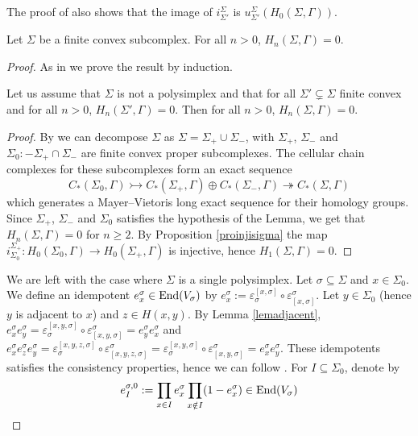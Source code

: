 \documentclass[a4paper,10pt]{amsart}
\begin{document}
\begin{Rem}
	The proof of \cite[Prop. 2.4.1 (b)]{Wanga} also shows that the image of $i_{\Sigma'}^{\Sigma}$ is $u_{\Sigma'}^{\Sigma}(H_0(\Sigma,\Gamma))$.
\end{Rem}

\begin{Lem}
	\label{lemHnzero}
	Let $\Sigma$ be a finite convex subcomplex. For all $n>0$, $H_n(\Sigma,\Gamma)=0$.
\end{Lem}

\begin{proof}
	As in \cite[Prop. 2.4.1 (a)]{Wanga} we prove the result by induction.

	\begin{Lem}
		Let us assume that $\Sigma$ is not a polysimplex and that for all $\Sigma' \subsetneq \Sigma$ finite convex and for all $n>0$, $H_n(\Sigma',\Gamma)=0$. Then for all $n>0$, $H_n(\Sigma,\Gamma)=0$.
	\end{Lem}

	\begin{proof}
		By \cite[Section 2.5]{meyer_resolutions_2010} we can decompose $\Sigma$ as $\Sigma=\Sigma_{+} \cup \Sigma_{-}$, with $\Sigma_{+}$, $\Sigma_{-}$ and $\Sigma_{0}:-\Sigma_{+}\cap \Sigma_{-}$ are finite convex proper subcomplexes. The cellular chain complexes for these subcomplexes form an exact sequence
		\[
			C_{*}(\Sigma_{0},\Gamma) \rightarrowtail C_{*}(\Sigma_{+},\Gamma) \oplus C_{*}(\Sigma_{-},\Gamma) \twoheadrightarrow C_{*}(\Sigma,\Gamma)
		\]
		which generates a Mayer–Vietoris long exact sequence for their homology groups. Since $\Sigma_{+}$, $\Sigma_{-}$ and $\Sigma_{0}$ satisfies the hypothesis of the Lemma, we get that $H_n(\Sigma,\Gamma)=0$ for $n\geq 2$. By Proposition \ref{proinjisigma} the map $i_{\Sigma_0}^{\Sigma_{+}} : H_0(\Sigma_0,\Gamma) \to H_0(\Sigma_{+},\Gamma)$ is injective, hence $H_1(\Sigma,\Gamma)=0$.
	\end{proof}

	We are left with the case where $\Sigma$ is a single polysimplex. Let $\sigma \subseteq \Sigma$ and $x\in \Sigma_0$. We define an idempotent $e_x^\sigma \in \operatorname{End}(V_\sigma)$ by  $e_x^\sigma:= \varepsilon_{\sigma}^{[x,\sigma]} \circ \varepsilon^{\sigma}_{[x,\sigma]}$. Let $y\in \Sigma_0$ (hence $y$ is adjacent to $x$) and $z\in H(x,y)$. By Lemma \ref{lemadjacent}, $e_x^\sigma e_y^\sigma = \varepsilon_{\sigma}^{[x,y,\sigma]} \circ \varepsilon^{\sigma}_{[x,y,\sigma]} = e_y^\sigma e_x^\sigma$ and $e_x^\sigma e_z^\sigma e_y^\sigma = \varepsilon_{\sigma}^{[x,y,z,\sigma]} \circ \varepsilon^{\sigma}_{[x,y,z,\sigma]}=\varepsilon_{\sigma}^{[x,y,\sigma]} \circ \varepsilon^{\sigma}_{[x,y,\sigma]}=e_x^\sigma e_y^\sigma$. These idempotents satisfies the consistency properties, hence we can follow \cite[Section 2.5]{meyer_resolutions_2010}. For $I \subseteq \Sigma_0$, denote by 
	\[
		e_I^{\sigma,0}:= \prod_{x\in I} e_x^\sigma \prod_{x\notin I} (1-e_x^\sigma) \in \operatorname{End}(V_\sigma)
	\]


\end{proof}
\end{document}
